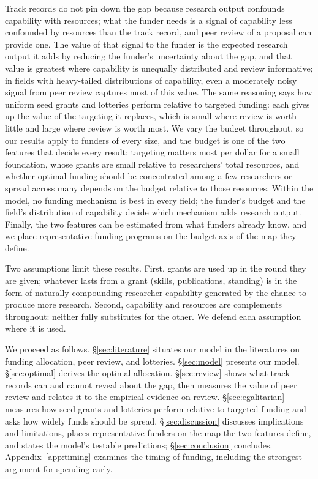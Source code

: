 \documentclass[article, 11pt, reqno]{amsart}
\theoremstyle{named}
\begin{document}
Track records do not pin down the gap because research output confounds capability with resources; what the funder needs is a signal of capability less confounded by resources than the track record, and peer review of a proposal can provide one. The value of that signal to the funder is the expected research output it adds by reducing the funder's uncertainty about the gap, and that value is greatest where capability is unequally distributed and review informative; in fields with heavy-tailed distributions of capability, even a moderately noisy signal from peer review captures most of this value. The same reasoning says how uniform seed grants and lotteries perform relative to targeted funding: each gives up the value of the targeting it replaces, which is small where review is worth little and large where review is worth most. We vary the budget throughout, so our results apply to funders of every size, and the budget is one of the two features that decide every result: targeting matters most per dollar for a small foundation, whose grants are small relative to researchers' total resources, and whether optimal funding should be concentrated among a few researchers or spread across many depends on the budget relative to those resources. Within the model, no funding mechanism is best in every field; the funder's budget and the field's distribution of capability decide which mechanism adds research output. Finally, the two features can be estimated from what funders already know, and we place representative funding programs on the budget axis of the map they define.

Two assumptions limit these results. First, grants are used up in the round they are given; whatever lasts from a grant (skills, publications, standing) is in the form of naturally compounding researcher capability generated by the chance to produce more research. Second, capability and resources are complements throughout: neither fully substitutes for the other. We defend each assumption where it is used.

We proceed as follows. \S\ref{sec:literature} situates our model in the literatures on funding allocation, peer review, and lotteries. \S\ref{sec:model} presents our model. \S\ref{sec:optimal} derives the optimal allocation. \S\ref{sec:review} shows what track records can and cannot reveal about the gap, then measures the value of peer review and relates it to the empirical evidence on review. \S\ref{sec:egalitarian} measures how seed grants and lotteries perform relative to targeted funding and asks how widely funds should be spread. \S\ref{sec:discussion} discusses implications and limitations, places representative funders on the map the two features define, and states the model's testable predictions; \S\ref{sec:conclusion} concludes. Appendix~\ref{app:timing} examines the timing of funding, including the strongest argument for spending early.
\end{document}
